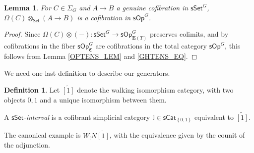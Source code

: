 \documentclass[a4paper,10pt
,draft
]{article}%
\numberwithin{equation}{section}
\numberwithin{figure}{section}
\newtheorem{lemma}[equation]{Lemma}%
\theoremstyle{definition} %
\newtheorem{definition}[equation]{Definition}%
\newcommand{\set}[1]{\left\{#1\right\}}%
\newcommand{\Set}{\ensuremath{\mathsf{Set}}}
\newcommand{\sSet}{\ensuremath{\mathsf{sSet}}}%
\newcommand{\sOp}{\ensuremath{\mathsf{sOp}}}%
\newcommand{\1}{\ensuremath{\mathbbm 1}}%
\begin{document}
\begin{lemma}
      \label{OPTENSCOF_LEM}
      For $C \in \Sigma_G$ and $A \to B$ a genuine cofibration in $\sSet^G$,
      $\Omega(C) \otimes_\Set (A \to B)$ is a cofibration in $\sOp^G$.
\end{lemma}
\begin{proof}
      Since $\Omega(C) \otimes (-) \colon \sSet^G \to \sOp^G_{\boldsymbol{E}(T)}$ preserves colimits,
      and by \cite[Prop. 4.11]{BP_HGOP} cofibrations in the fiber $\sOp^G_{\mathfrak C}$ are cofibrations in the total category $\sOp^G$, %
      this follows from Lemma \ref{OPTENS_LEM} and \eqref{GHTENS_EQ}.
\end{proof}

























We need one last definition to describe our generators.
\begin{definition}
      Let $\widetilde{[1]}$ denote the walking isomorphism category,
      with two objects $0,1$ and a unique isomorphism between them.
      
      A \textit{$\sSet$-interval} is a cofibrant simplicial category $\mathbb I \in \mathsf{sCat}_{\set{0,1}}$ equivalent to $\widetilde{[1]}$.
\end{definition}
The canonical example is $W_!N\widetilde{[1]}$, with the equivalence given by the counit of the adjunction.
\end{document}
